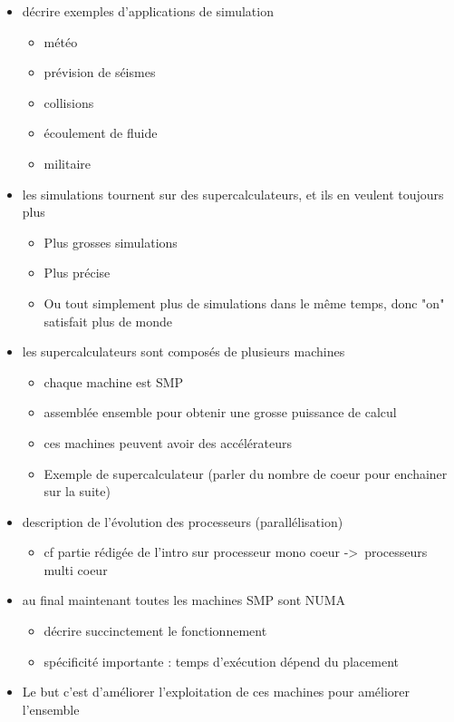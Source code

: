 \begin{itemize}
  \item décrire exemples d'applications de simulation
  \begin{itemize}
    \item météo
    \item prévision de séismes
    \item collisions
    \item écoulement de fluide
    \item militaire
  \end{itemize}
  \item les simulations tournent sur des supercalculateurs, et ils en veulent toujours plus
  \begin{itemize}
    \item Plus grosses simulations
    \item Plus précise
    \item Ou tout simplement plus de simulations dans le même temps, donc "on" satisfait plus de monde
  \end{itemize}
  \item les supercalculateurs sont composés de plusieurs machines
  \begin{itemize}
    \item chaque machine est SMP
    \item assemblée ensemble pour obtenir une grosse puissance de calcul
    \item ces machines peuvent avoir des accélérateurs
    \item Exemple de supercalculateur (parler du nombre de coeur pour enchainer sur la suite)
  \end{itemize}
  \item description de l'évolution des processeurs (parallélisation)
  \begin{itemize}
    \item cf partie rédigée de l'intro sur processeur mono coeur -> processeurs multi coeur
  \end{itemize}
  \item au final maintenant toutes les machines SMP sont NUMA
  \begin{itemize}
    \item décrire succinctement le fonctionnement
    \item spécificité importante : temps d'exécution dépend du placement
  \end{itemize}
  \item Le but c'est d'améliorer l'exploitation de ces machines pour améliorer l'ensemble

\end{itemize}
